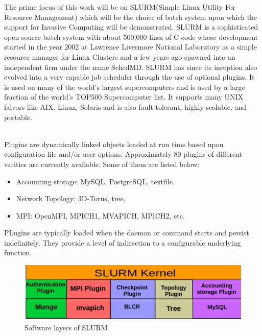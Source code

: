 \documentclass[a4paper, 12pt]{article}
\begin{document}
The prime focus of this work will be on SLURM(Simple Linux Utility For Resource Management) which will be the choice of batch system upon which the support for Invasive Computing will be demonstrated. SLURM is a sophisticated open source batch system with about 500,000 lines of C code whose development started in the year 2002 at Lawrence Livermore National Laboratory as a simple resource manager for Linux Clusters and a few years ago spawned into an independent firm under the name SchedMD. SLURM has since its inception also evolved into a very capable job scheduler through the use of optional plugins. It is used on many of the world's largest supercomputers and is used by a large fraction of the world's TOP500 Supercomputer list. It supports many UNIX falvors like AIX, Linux, Solaris and is also fault tolerant, highly scalable, and portable.\par
\noindent
\\
Plugins are dynamically linked objects loaded at run time based upon configuration file and/or user options. Approximately $80$ plugins of different varities are currently available. Some of them are listed below:\\
\begin{itemize}
\item Accounting storage: MySQL, PostgreSQL, textfile.
\item Network Topology: 3D-Torus, tree.
\item MPI: OpenMPI, MPICH1, MVAPICH, MPICH2, etc.
\end{itemize} 
PLugins are typically loaded when the daemon or command starts and persist indefinitely. They provide a level of indirection to a configurable underlying function.
\begin{figure}[h]
\centering
\includegraphics[width=1.0\textwidth]{./plugin.eps}
\vspace{-0.15in}
\caption{Software layers of SLURM}
\label{fig:6}
\end{figure}
\end{document}
